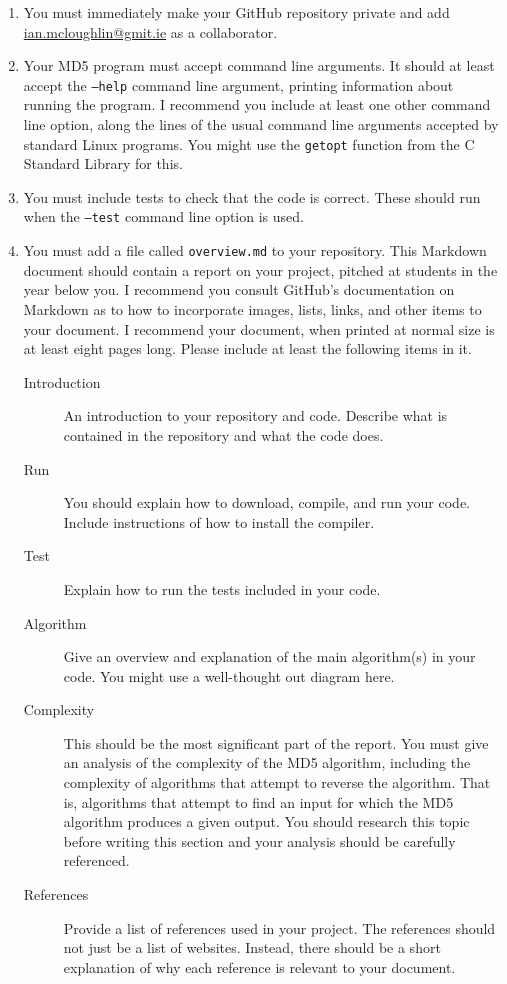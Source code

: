 \documentclass[12pt, a4paper]{article}
\begin{document}
\begin{enumerate}
  \item You must immediately make your GitHub repository private and add \url{ian.mcloughlin@gmit.ie} as a collaborator.
  \item Your MD5 program must accept command line arguments. It should at least accept the \texttt{--help} command line argument, printing information about running the program. I recommend you include at least one other command line option, along the lines of the usual command line arguments accepted by standard Linux programs. You might use the \texttt{getopt} function from the C Standard Library for this.
  \item You must include tests to check that the code is correct. These should run when the \texttt{--test} command line option is used.
  \item You must add a file called \texttt{overview.md} to your repository. This Markdown document should contain a report on your project, pitched at students in the year below you. I recommend you consult GitHub's documentation on Markdown as to how to incorporate images, lists, links, and other items to your document. I recommend your document, when printed at normal size is at least eight pages long. Please include at least the following items in it.
  \begin{description}
    \item[Introduction] An introduction to your repository and code. Describe what is contained in the repository and what the code does.
    \item[Run] You should explain how to download, compile, and run your code. Include instructions of how to install the compiler.
    \item[Test] Explain how to run the tests included in your code.
    \item[Algorithm] Give an overview and explanation of the main algorithm(s) in your code. You might use a well-thought out diagram here.
    \item[Complexity] This should be the most significant part of the report. You must give an analysis of the complexity of the MD5 algorithm, including the complexity of algorithms that attempt to reverse the algorithm. That is, algorithms that attempt to find an input for which the MD5 algorithm produces a given output. You should research this topic before writing this section and your analysis should be carefully referenced.
    \item[References] Provide a list of references used in your project. The references should not just be a list of websites. Instead, there should be a short explanation of why each reference is relevant to your document.
  \end{description}
\end{enumerate}
\end{document}
